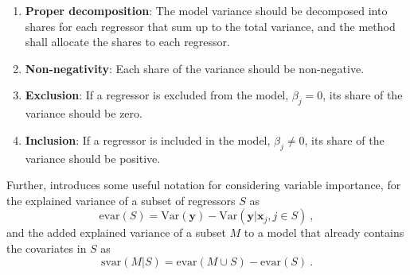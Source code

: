 \begin{enumerate}
    \label{list:criteria}
    \item \textbf{Proper decomposition}: The model variance should be decomposed into shares for each regressor that sum up to the total variance, and the method shall allocate the shares to each regressor.
    \item \textbf{Non-negativity}: Each share of the variance should be non-negative.
    \item \textbf{Exclusion}: If a regressor is excluded from the model, $\beta_j=0$, its share of the variance should be zero.
    \item \textbf{Inclusion}: If a regressor is included in the model, $\beta_j \neq 0$, its share of the variance should be positive.
\end{enumerate}
Further, \citet{gromping_relaimpo} introduces some useful notation for considering variable importance, for the explained variance of a subset of regressors $S$ as 
\begin{equation}
    \text{evar}(S) = \text{Var}(\mathbf{y}) - \text{Var}(\mathbf{y} \lvert \mathbf{x}_j, j\in S) \ ,
\end{equation}
and the added explained variance of a subset $M$ to a model that already contains the covariates in $S$ as
\begin{equation}
    \text{svar}(M \lvert S) = \text{evar}(M \cup S) - \text{evar}(S) \ .
\end{equation}

